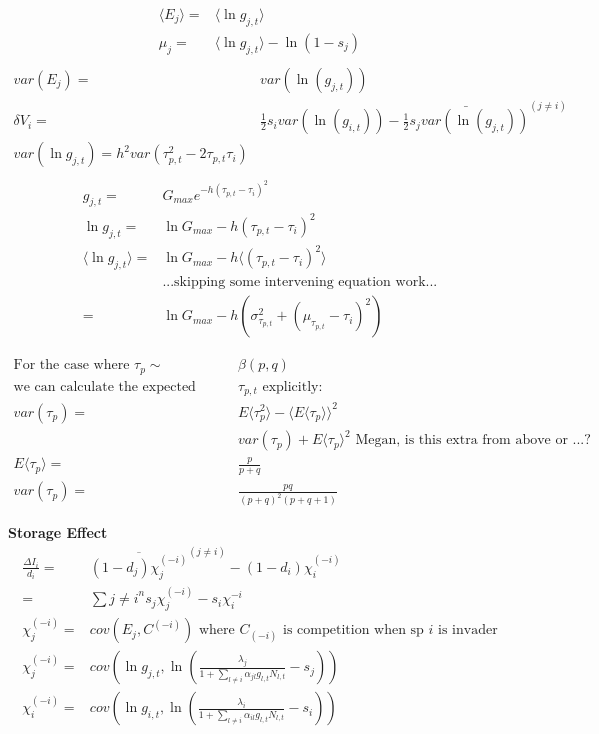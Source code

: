 \documentclass[11pt,a4paper,oneside]{article}
\begin{document}
\begin{align}
 \langle E_{j} \rangle = & \langle \ln g_{j,t} \rangle \\
\mu_{j} = & \langle \ln g_{j,t} \rangle - \ln(1-s_{j}) \\
\end{align}
\begin{align}
var(E_{j}) = & var(\ln(g_{j,t}))\\
\delta V_{i} = & \frac{1}{2} s_{i} var(\ln(g_{i,t}))-\bar{\frac{1}{2} s_{j} var(\ln(g_{j,t}))}^{(j \neq i)} \\
var(\ln g_{j,t}) = h^2 var(\tau_{p,t}^{2} - 2 \tau_{p,t}\tau_{i})\\
\end{align}
\begin{align}
g_{j,t} = & G_{max} e^{-h(\tau_{p,t}-\tau_{i})^2}\\
\ln g_{j,t} = & \ln G_{max}-h(\tau_{p,t}-\tau_{i})^2\\
\langle \ln g_{j,t} \rangle = & \ln G_{max} - h \langle (\tau_{p,t}-\tau_{i})^2 \rangle\\
& \text{...skipping some intervening equation work...}\\
= & \ln G_{max} - h (\sigma^{2}_{\tau_{p,t}}+(\mu_{\tau_{p,t}}-\tau_{i})^{2})
\end{align}

\begin{align*}
\text{For the case where } \tau_{p} \sim & \beta(p,q)\\
\text{we can calculate the expected value and variance of }&\tau_{p,t} \text{ explicitly}: \\
var (\tau_{p}) = & E \langle \tau_{p}^{2}\rangle - \langle E \langle \tau_{p} \rangle\rangle ^{2}\\
 & var(\tau_{p})+ E \langle \tau_{p}\rangle ^{2} \text{ Megan, is this extra from above or ...?}\\
E \langle \tau_{p} \rangle = & \frac{p}{p+q}\\
var(\tau_{p}) = & \frac{pq}{(p+q)^{2}(p+q+1)}
\end{align*}


\noindent \textbf{Storage Effect}
\begin{align*}
\frac{\Delta I_{i}}{d_{i}} = & \overline{(1-d_{j})\chi_{j}^{(-i)}}^{(j\neq i)} - (1-d_{i})\chi_{i}^{(-i)}\\
= & \sum\limits{j \neq i}^{n} s_j \chi_{j}^{(-i)} - s_{i} \chi_{i}^{-i}\\
\chi_{j}^{(-i)} = & cov(E_{j},C^{(-i)}) \text{ where $C_{(-i)}$ is competition when sp $i$ is invader}\\
\chi_{j}^{(-i)}  = & cov(\ln g_{j,t}, \ln(\frac{\lambda_{j}}{1+\sum \limits_{l \neq i} \alpha_{jl}g_{l,t}N_{l,t}}-s_{j}))\\
\chi_{i}^{(-i)}  = & cov(\ln g_{i,t}, \ln(\frac{\lambda_{i}}{1+\sum \limits_{l \neq i} \alpha_{il}g_{l,t}N_{l,t}}-s_{i}))\\
\end{align*}
\end{document}
